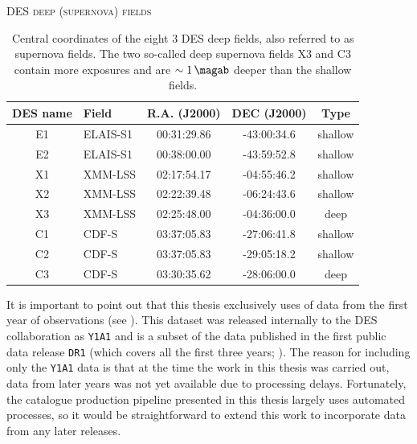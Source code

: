 \begin{table}[!htbp]
\centering
\textsc{DES deep (supernova) fields} \\
\vspace{0.1em}
\footnotesize
\begin{tabular}{clccc}
\toprule\toprule
DES name & Field & R.A. (J2000) & DEC (J2000) & Type \\
\midrule
E1 & ELAIS-S1  & 00:31:29.86 & -43:00:34.6 & shallow \\
E2 & ELAIS-S1  & 00:38:00.00 & -43:59:52.8 & shallow \\
X1 & XMM-LSS  & 02:17:54.17 & -04:55:46.2 & shallow \\
X2 & XMM-LSS  & 02:22:39.48 & -06:24:43.6 & shallow \\
X3 & XMM-LSS  & 02:25:48.00 & -04:36:00.0 & deep \\ 
C1 & CDF-S  & 03:37:05.83 & -27:06:41.8 & shallow \\
C2 & CDF-S  & 03:37:05.83 & -29:05:18.2 & shallow \\
C3 & CDF-S  & 03:30:35.62 & -28:06:00.0 & deep \\
\bottomrule
\end{tabular}
\vspace{1em}
\caption[Coordinates of the DES deep fields]{Central coordinates of the eight \SI{3}{\sqdeg} DES deep fields, also referred to as supernova fields. The two so-called deep supernova fields X3 and C3 contain more exposures and are  $\sim\SI{1}{\magab}$  deeper than the shallow fields.}
\label{table:fields}
\end{table}



It is important to point out that this thesis exclusively uses of data from the first year of observations (see \citealt{2014SPIE.9149E..0VD}). This dataset was released internally to the DES collaboration as \texttt{Y1A1} \citep{2018ApJS..235...33D} and is a subset of the data published in the first public data release \texttt{DR1} (which covers all the first three years; \citealt{2018ApJS..239...18A}). The reason for including only the \texttt{Y1A1} data is that at the time the work in this thesis was carried out, data from later years was not yet available due to processing delays. Fortunately, the \DESVIDEO catalogue production pipeline presented in this thesis largely uses automated processes, so it would be straightforward to extend this work to incorporate data from any later releases. \par 




